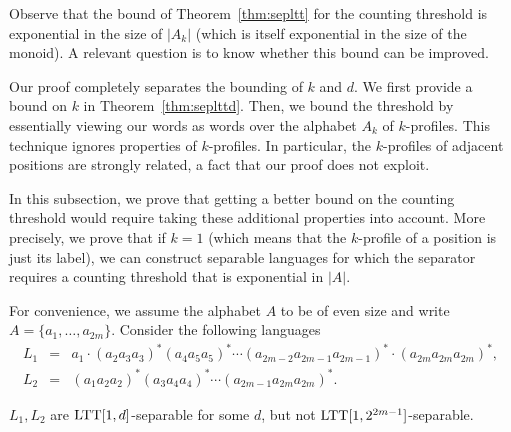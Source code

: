 \documentclass{LMCS}
\newcommand{\ltt}{\textup{LTT}\xspace}
\newcommand\profile[1]{$#1$-profile\xspace}
\newcommand\profiles[1]{$#1$-profiles\xspace}
\newcommand\kprofile{\profile{k}}
\newcommand\kprofiles{\profiles{k}}
\theoremstyle{plain}
\begin{document}
Observe that the bound of Theorem~\ref{thm:sepltt} for the
counting threshold is exponential in the size of $|A_k|$ (which is
itself exponential in the size of the monoid). A relevant question is
to know whether this bound can be improved.

Our proof completely separates the bounding of $k$ and $d$. We first
provide a bound on $k$ in Theorem~\ref{thm:seplttd}. Then, we bound
the threshold by essentially viewing our words as words over the
alphabet $A_k$ of \kprofiles. This technique ignores properties of
\kprofiles. In particular, the \kprofiles of adjacent positions are
strongly related, a fact that our proof does not exploit.

In this subsection, we prove that getting a better bound on the
counting threshold would require taking these additional properties
into account. More precisely, we prove that if $k=1$ (which means that the
\kprofile of a position is just its label), we can construct separable
languages for which the separator requires a counting threshold that
is exponential in $|A|$.

For convenience, we assume the alphabet $A$ to be of even size and
write $A=\{a_1,\dots,a_{2m}\}$. Consider the following languages
\[
\begin{array}{lcl}
  L_1 & = & a_1\cdot(a_2a_3a_3)^*(a_4a_5a_5)^* \cdots (a_{2m-2}a_{2m-1}a_{2m-1})^*\cdot(a_{2m}a_{2m}a_{2m})^*,
  \\
  L_2 & = & (a_1a_2a_2)^*(a_3a_4a_4)^* \cdots (a_{2m-1}a_{2m}a_{2m})^*.
\end{array}
\]


\begin{lem} \label{lem:counterexample}
  $L_1,L_2$ are $\ltt[1,d]$-separable for some $d$, but not 
  $\ltt[1,2^{2m-1}]$-separable.
\end{lem}
\end{document}
